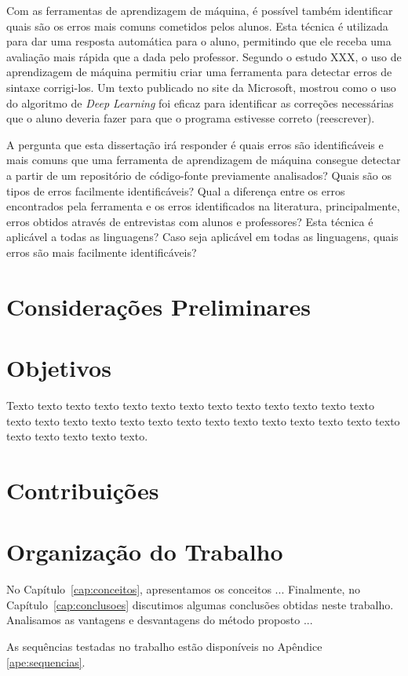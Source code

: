 Com as ferramentas de aprendizagem de máquina, é possível também identificar quais são os erros mais comuns cometidos pelos alunos. Esta técnica é utilizada para dar uma resposta automática para o aluno, permitindo que ele receba uma avaliação mais rápida que a dada pelo professor. Segundo o estudo XXX, o uso de aprendizagem de máquina permitiu criar uma ferramenta para detectar erros de sintaxe corrigi-los. Um texto publicado no site da Microsoft, mostrou como o uso do algoritmo de \textit{Deep Learning} foi eficaz para identificar as correções necessárias que o aluno deveria fazer para que o programa estivesse correto (reescrever).

A pergunta que esta dissertação irá responder é quais erros são identificáveis e mais comuns que uma ferramenta de aprendizagem de máquina consegue detectar a partir de um repositório de código-fonte previamente analisados? Quais são os tipos de erros facilmente identificáveis? Qual a diferença entre os erros encontrados pela ferramenta e os erros identificados na literatura, principalmente, erros obtidos através de entrevistas com alunos e professores? Esta técnica é aplicável a todas as linguagens? Caso seja aplicável em todas as linguagens, quais erros são mais facilmente identificáveis?


\section{Considerações Preliminares}
\label{sec:consideracoes_preliminares}



 

\section{Objetivos}
\label{sec:objetivo}

Texto texto texto texto texto texto texto texto texto texto texto texto texto
texto texto texto texto texto texto texto texto texto texto texto texto texto
texto texto texto texto texto texto.

\section{Contribuições}
\label{sec:contribucoes}



\section{Organização do Trabalho}
\label{sec:organizacao_trabalho}

No Capítulo~\ref{cap:conceitos}, apresentamos os conceitos ... Finalmente, no
Capítulo~\ref{cap:conclusoes} discutimos algumas conclusões obtidas neste
trabalho. Analisamos as vantagens e desvantagens do método proposto ... 

As sequências testadas no trabalho estão disponíveis no Apêndice \ref{ape:sequencias}.
